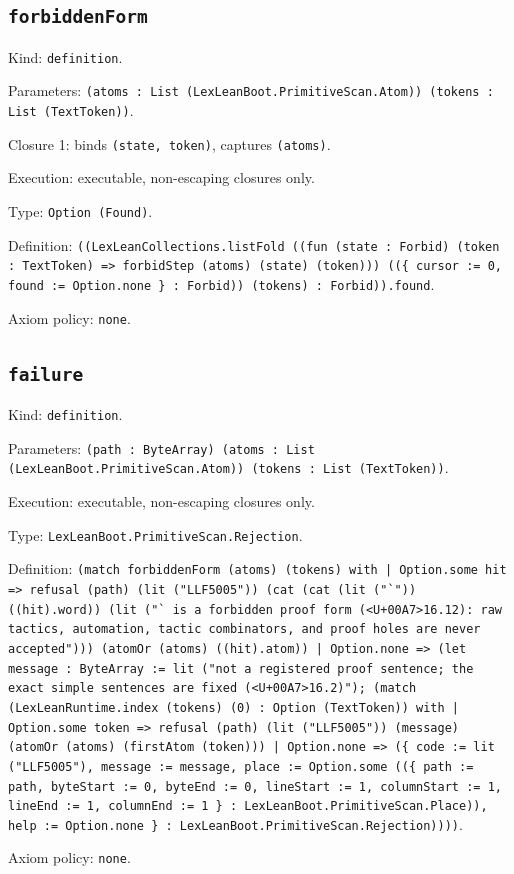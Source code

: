 \documentclass[11pt]{article}
\begin{document}
\subsection*{\texttt{forbiddenForm}}
\noindent Kind: \texttt{definition}.\par
\noindent Parameters: \texttt{(atoms : List (LexLeanBoot.PrimitiveScan.Atom)) (tokens : List (TextToken))}.\par
\noindent Closure 1: binds \texttt{(state, token)}, captures \texttt{(atoms)}.\par
\noindent Execution: executable, non-escaping closures only.\par
\noindent Type: \texttt{Option (Found)}.\par
\noindent Definition: \texttt{((LexLeanCollections.listFold ((fun (state : Forbid) (token : TextToken) => forbidStep (atoms) (state) (token))) ((\{ cursor := 0, found := Option.none \} : Forbid)) (tokens) : Forbid)).found}.\par
\noindent Axiom policy: \texttt{none}.\par
\subsection*{\texttt{failure}}
\noindent Kind: \texttt{definition}.\par
\noindent Parameters: \texttt{(path : ByteArray) (atoms : List (LexLeanBoot.PrimitiveScan.Atom)) (tokens : List (TextToken))}.\par
\noindent Execution: executable, non-escaping closures only.\par
\noindent Type: \texttt{LexLeanBoot.PrimitiveScan.Rejection}.\par
\noindent Definition: \texttt{(match forbiddenForm (atoms) (tokens) with | Option.some hit => refusal (path) (lit ("LLF5005")) (cat (cat (lit ("`")) ((hit).word)) (lit ("` is a forbidden proof form (<U+00A7>16.12): raw tactics, automation, tactic combinators, and proof holes are never accepted"))) (atomOr (atoms) ((hit).atom)) | Option.none => (let message : ByteArray := lit ("not a registered proof sentence; the exact simple sentences are fixed (<U+00A7>16.2)"); (match (LexLeanRuntime.index (tokens) (0) : Option (TextToken)) with | Option.some token => refusal (path) (lit ("LLF5005")) (message) (atomOr (atoms) (firstAtom (token))) | Option.none => (\{ code := lit ("LLF5005"), message := message, place := Option.some ((\{ path := path, byteStart := 0, byteEnd := 0, lineStart := 1, columnStart := 1, lineEnd := 1, columnEnd := 1 \} : LexLeanBoot.PrimitiveScan.Place)), help := Option.none \} : LexLeanBoot.PrimitiveScan.Rejection))))}.\par
\noindent Axiom policy: \texttt{none}.\par
\end{document}

